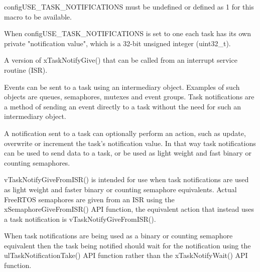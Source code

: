 \begin{DoxyPre}configUSE\_TASK\_NOTIFICATIONS must be undefined or defined as 1 for this macro
to be available.\end{DoxyPre}



\begin{DoxyPre}When configUSE\_TASK\_NOTIFICATIONS is set to one each task has its own private
"notification value", which is a 32-bit unsigned integer (uint32\_t).\end{DoxyPre}



\begin{DoxyPre}A version of xTaskNotifyGive() that can be called from an interrupt service
routine (ISR).\end{DoxyPre}



\begin{DoxyPre}Events can be sent to a task using an intermediary object.  Examples of such
objects are queues, semaphores, mutexes and event groups.  Task notifications
are a method of sending an event directly to a task without the need for such
an intermediary object.\end{DoxyPre}



\begin{DoxyPre}A notification sent to a task can optionally perform an action, such as
update, overwrite or increment the task's notification value.  In that way
task notifications can be used to send data to a task, or be used as light
weight and fast binary or counting semaphores.\end{DoxyPre}



\begin{DoxyPre}vTaskNotifyGiveFromISR() is intended for use when task notifications are
used as light weight and faster binary or counting semaphore equivalents.
Actual FreeRTOS semaphores are given from an ISR using the
xSemaphoreGiveFromISR() API function, the equivalent action that instead uses
a task notification is vTaskNotifyGiveFromISR().\end{DoxyPre}



\begin{DoxyPre}When task notifications are being used as a binary or counting semaphore
equivalent then the task being notified should wait for the notification
using the ulTaskNotificationTake() API function rather than the
xTaskNotifyWait() API function.\end{DoxyPre}



